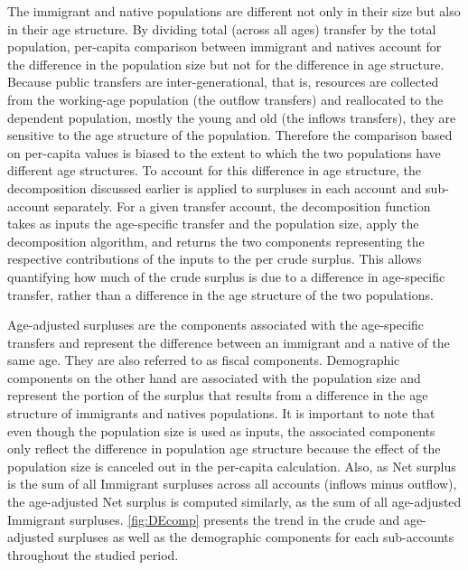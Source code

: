 The immigrant and native populations are different not only in their size but also in their age structure.
By dividing total (across all ages) transfer by the total population, per-capita comparison between immigrant and natives account for the difference in the population size but not for the difference in age structure.
Because public transfers are inter-generational, that is, resources are collected from the working-age population (the outflow transfers) and reallocated to the dependent population, mostly the young and old (the inflows transfers), they are sensitive to the age structure of the population.
Therefore the comparison based on per-capita values is biased to the extent to which the two populations have different age structures.
To account for this difference in age structure, the decomposition discussed earlier is applied to surpluses in each account and sub-account separately.
For a given transfer account, the decomposition function takes as inputs the age-specific transfer and the population size, apply the decomposition algorithm, and returns the two components representing the respective contributions of the inputs to the per crude surplus.
This allows quantifying how much of the crude surplus is due to a difference in age-specific transfer, rather than a  difference in the age structure of the two populations.

\vspace{0.7em}\par
Age-adjusted surpluses are the components associated with the age-specific transfers and represent the difference between an immigrant and a native of the same age.
They are also referred to as fiscal components.
Demographic components on the other hand are associated with the population size and represent the portion of the surplus that results from a difference in the age structure of immigrants and natives populations.
It is important to note that even though the population size is used as inputs, the associated components only reflect the difference in population age structure because the effect of the population size is canceled out in the per-capita calculation.
Also, as Net surplus is the sum of all Immigrant surpluses across all accounts (inflows minus outflow), the age-adjusted Net surplus is computed similarly, as the sum of all age-adjusted Immigrant surpluses. \autoref{fig:DEcomp} presents the trend in the crude and age-adjusted surpluses as well as the demographic components for each sub-accounts throughout the studied period.

